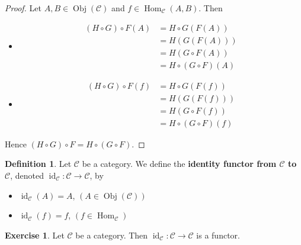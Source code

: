 \documentclass{book}
\theoremstyle{definition}
\newtheorem{defn}[definition]{Definition}
\newtheorem{ex}[definition]{Exercise}
\newcommand{\MC}{\mathcal{C}}
\newcommand{\lex}[1]{\label{ex:#1}}
\newcommand{\ld}[1]{\label{defn:#1}}
\DeclareMathOperator{\id}{id}
\DeclareMathOperator{\Obj}{Obj}
\DeclareMathOperator{\Hom}{Hom}
\DeclareMathOperator*{\0}{\mbf{0}}
\DeclareMathOperator*{\1}{\mbf{1}}
\begin{document}
	\begin{proof}
		Let $A, B \in \Obj(\MC)$ and $f \in \Hom_{\MC}(A,B)$. Then 
		\begin{itemize}
				\item 
				\begin{align*}
					(H \circ G) \circ F(A) 
					& = H \circ G (F(A)) \\
					& = H (G(F(A))) \\
					& = H( G \circ F (A)) \\
					& = H \circ (G \circ F) (A)
				\end{align*}
				\item  
				\begin{align*}
					(H \circ G) \circ F(f) 
					& = H \circ G (F(f)) \\
					& = H (G(F(f))) \\
					& = H( G \circ F (f)) \\
					& = H \circ (G \circ F) (f)
				\end{align*}
		\end{itemize}
		Hence $(H \circ G) \circ F = H \circ (G \circ F)$.
	\end{proof}

	\begin{defn} \ld{13004}
		Let $\MC$ be a category. We define the \textbf{identity functor from $\MC$ to $\MC$}, denoted $\id_{\MC}: \MC \rightarrow \MC$, by 
		\begin{itemize}
			\item $\id_{\MC}(A) = A$, $(A \in \Obj(\MC))$
			\item $\id_{\MC}(f) = f$, $(f \in \Hom_{\MC})$
		\end{itemize}
	\end{defn}
	
	\begin{ex}  \lex{13005}
		Let $\MC$ be a category. Then $\id_{\MC}: \MC \rightarrow \MC$ is a functor.
	\end{ex}
	
\end{document}
